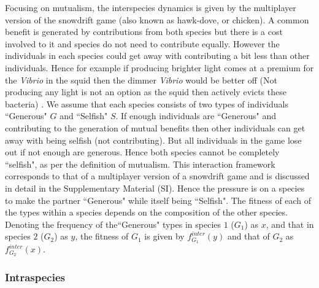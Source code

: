 \documentclass[12pt]{article}
\begin{document}
Focusing on mutualism, the interspecies dynamics is given by the multiplayer version of the snowdrift game \citep{bergstrom:PNAS:2003,souza:JTB:2009,gokhale:PRSB:2012} (also known as hawk-dove, or chicken).
A common benefit is generated by contributions from both species but there is a cost involved to it and species do not need to contribute equally. 
However the individuals in each species could get away with contributing a bit less than other individuals.
Hence for example if producing brighter light comes at a premium for the \textit{Vibrio} in the squid then the dimmer \textit{Vibrio} would be better off (Not producing any light is not an option as the squid then actively evicts these bacteria) \citep{mcfallngai:PLoSB:2014}.
We assume that each species consists of two types of individuals ``Generous" $G$ and ``Selfish" $S$. 
If enough individuals are ``Generous" and contributing to the generation of mutual benefits then other individuals can get away with being selfish (not contributing). 
But all individuals in the game lose out if not enough are generous. Hence both species cannot be completely ``selfish", as per the definition of mutualism.
This interaction framework corresponds to that of a multiplayer version of a snowdrift game and is discussed in detail in the Supplementary Material (SI).
Hence the pressure is on a species to make the partner ``Generous" while itself being ``Selfish".
The fitness of each of the types within a species depends on the composition of the other species.
Denoting the frequency of the``Generous" types in species $1$ ($G_1$) as $x$, and that in species $2$ ($G_2$) as $y$, the fitness of $G_1$  is given by $f^{inter}_{G_1} (y)$ and that of $G_2$ as $f^{inter}_{G_2} (x)$. 

\subsubsection{Intraspecies}
\end{document}
